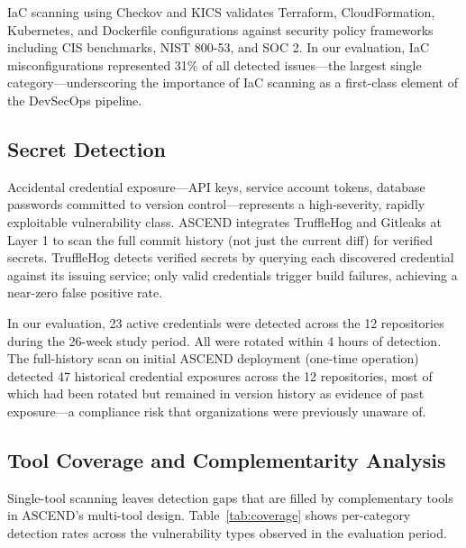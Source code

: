 \documentclass[journal]{IEEEtran}
\begin{document}
IaC scanning using Checkov and KICS validates Terraform, CloudFormation, Kubernetes, and Dockerfile configurations against security policy frameworks including CIS benchmarks, NIST 800-53, and SOC 2. In our evaluation, IaC misconfigurations represented 31\% of all detected issues---the largest single category---underscoring the importance of IaC scanning as a first-class element of the DevSecOps pipeline.

\subsection{Secret Detection}

Accidental credential exposure---API keys, service account tokens, database passwords committed to version control---represents a high-severity, rapidly exploitable vulnerability class. ASCEND integrates TruffleHog and Gitleaks at Layer 1 to scan the full commit history (not just the current diff) for verified secrets. TruffleHog detects verified secrets by querying each discovered credential against its issuing service; only valid credentials trigger build failures, achieving a near-zero false positive rate.

In our evaluation, 23 active credentials were detected across the 12 repositories during the 26-week study period. All were rotated within 4 hours of detection. The full-history scan on initial ASCEND deployment (one-time operation) detected 47 historical credential exposures across the 12 repositories, most of which had been rotated but remained in version history as evidence of past exposure---a compliance risk that organizations were previously unaware of.

\subsection{Tool Coverage and Complementarity Analysis}

Single-tool scanning leaves detection gaps that are filled by complementary tools in ASCEND's multi-tool design. Table~\ref{tab:coverage} shows per-category detection rates across the vulnerability types observed in the evaluation period.
\end{document}
